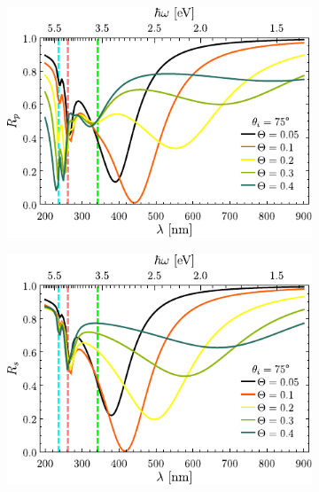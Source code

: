 \begin{figure}[b!]\centering\hspace*{-1.5em}
	\begin{subfigure}{.01\linewidth}\caption{}\label{sfig:R-ATR10-cutp}\vspace{4.75cm}\end{subfigure}
	\begin{subfigure}{.45\linewidth}\hspace*{-1.5em}
	\includegraphics[scale=.98]{2-Resultados/figs/2-Wp10ThetaVar/cut_angle_75_p.pdf}\end{subfigure}
	\begin{subfigure}{.01\linewidth}\caption{}\label{sfig:R-ATR10-cuts}\vspace{4.75cm}\end{subfigure}\hspace*{-1.em}
	\begin{subfigure}{.45\linewidth}\centering
	\includegraphics[scale=.98 ]{2-Resultados/figs/2-Wp10ThetaVar/cut_angle_75_s.pdf}\end{subfigure}\vspace*{-.5em}

\end{figure}
